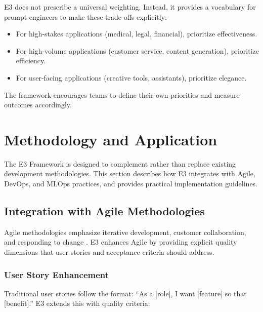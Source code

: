 \documentclass[11pt,a4paper]{article}
\begin{document}
E3 does not prescribe a universal weighting. Instead, it provides a vocabulary for prompt engineers to make these trade-offs explicitly:

\begin{itemize}[leftmargin=2em]
    \item For high-stakes applications (medical, legal, financial), prioritize effectiveness.
    \item For high-volume applications (customer service, content generation), prioritize efficiency.
    \item For user-facing applications (creative tools, assistants), prioritize elegance.
\end{itemize}

The framework encourages teams to define their own priorities and measure outcomes accordingly.



\section{Methodology and Application}

The E3 Framework is designed to complement rather than replace existing development methodologies. This section describes how E3 integrates with Agile, DevOps, and MLOps practices, and provides practical implementation guidelines.

\subsection{Integration with Agile Methodologies}

Agile methodologies emphasize iterative development, customer collaboration, and responding to change \cite{beck2000extreme}. E3 enhances Agile by providing explicit quality dimensions that user stories and acceptance criteria should address.

\subsubsection{User Story Enhancement}

Traditional user stories follow the format: ``As a [role], I want [feature] so that [benefit].'' E3 extends this with quality criteria:
\end{document}
